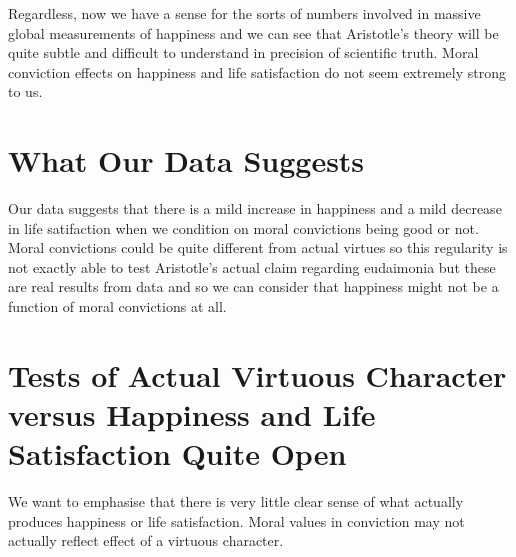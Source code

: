 \documentclass{amsart}
\begin{document}
Regardless, now we have a sense for the sorts of numbers involved in massive global measurements of happiness and we can see that Aristotle's theory will be quite subtle and difficult to understand in precision of scientific truth.  Moral conviction effects on happiness and life satisfaction do not seem extremely strong to us.

\section{What Our Data Suggests}

Our data suggests that there is a mild increase in happiness and a mild decrease in life satifaction when we condition on moral convictions being good or not.  Moral convictions could be quite different from actual virtues so this regularity is not exactly able to test Aristotle's actual claim regarding eudaimonia but these are real results from data and so we can consider that happiness might not be a function of moral convictions at all.  

\section{Tests of Actual Virtuous Character versus Happiness and Life Satisfaction Quite Open}

We want to emphasise that there is very little clear sense of what actually produces happiness or life satisfaction. Moral values in conviction may not actually reflect effect of a virtuous character.
\end{document}
